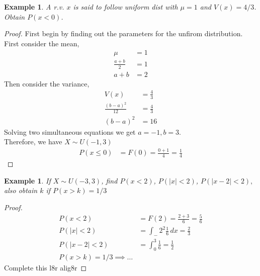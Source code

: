\documentclass[oneside,11pt,pdftex]{book}%
\numberwithin{equation}{section}
\newtheorem{example}[theorem]{Example}
\numberwithin{section}{chapter}
\numberwithin{equation}{chapter}
\begin{document}
\begin{example}
	A r.v. $ x $ is said to follow uniform dist with $ \mu=1 $ and $ V(x) = 4/3$. Obtain $ P(x<0) $.
\end{example}
\begin{proof}
	First begin by finding out the parameters for the unfirom distribution.\\
	First consider the mean,
	\begin{align*}
		\mu&=1\\
		\frac{a+b}{2}&=1\\
		a+b&=2
	\end{align*}
	Then consider the variance,
	\begin{align*}
		V(x)&=\frac{4}{3}\\
		\frac{(b-a)^2}{12}&=\frac{4}{3}\\
		(b-a)^2&=16
	\end{align*}
	Solving two simultaneous equations we get $ a=-1, b=3 $.\\
	Therefore, we have $ X \sim U(-1,3) $\\
	\begin{align*}
		P(x\leq0)&=F(0)=\frac{0+1}{4}=\frac{1}{4}
	\end{align*}
\end{proof}


\begin{example}
	If $ X \sim U(-3,3) $, find $ P(x<2) $, $ P(|x|<2) $, $ P(|x-2|<2),$ also obtain $ k $ if $ P(x>k) =1/3$
\end{example}
\begin{proof}
	\begin{align*}
		P(x<2)&=F(2)=\frac{2+3}{6}=
		\frac{5}{6}\\
		P(|x|<2)&=\int_-2^2 \frac{1}{6}\, dx = \frac{2}{3}\\
		P(|x-2|<2)&=\int_0^3 \frac{1}{6}=\frac{1}{2}\\
		P(x>k)=1/3\implies \dots
	\end{align*}
	Complete this l8r alig8r
	
\end{proof}
\end{document}
